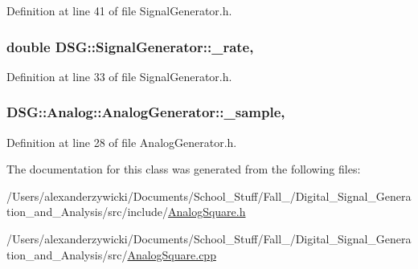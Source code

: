 Definition at line 41 of file Signal\-Generator.\-h.

\hypertarget{classDSG_1_1SignalGenerator_aa10f6c85d9adee901139ea7fb346f39d}{
\subsubsection[{\-\_\-rate}]{\setlength{\rightskip}{0pt plus 5cm}double D\-S\-G\-::\-Signal\-Generator\-::\-\_\-rate\hspace{0.3cm}{\ttfamily [protected]}, {\ttfamily [inherited]}}}\label{classDSG_1_1SignalGenerator_aa10f6c85d9adee901139ea7fb346f39d}


Definition at line 33 of file Signal\-Generator.\-h.

\hypertarget{classDSG_1_1Analog_1_1AnalogGenerator_af20b26cee2cd03dfdb3d845f527b2f1c}{
\subsubsection[{\-\_\-sample}]{ D\-S\-G\-::\-Analog\-::\-Analog\-Generator\-::\-\_\-sample\hspace{0.3cm}{\ttfamily [protected]}, {\ttfamily [inherited]}}}\label{classDSG_1_1Analog_1_1AnalogGenerator_af20b26cee2cd03dfdb3d845f527b2f1c}


Definition at line 28 of file Analog\-Generator.\-h.



The documentation for this class was generated from the following files\-:\begin{DoxyCompactItemize}
\item 
/\-Users/alexanderzywicki/\-Documents/\-School\-\_\-\-Stuff/\-Fall\-\_/\-Digital\-\_\-\-Signal\-\_\-\-Generation\-\_\-and\-\_\-\-Analysis/src/include/\hyperlink{AnalogSquare_8h}{Analog\-Square.\-h}\item 
/\-Users/alexanderzywicki/\-Documents/\-School\-\_\-\-Stuff/\-Fall\-\_/\-Digital\-\_\-\-Signal\-\_\-\-Generation\-\_\-and\-\_\-\-Analysis/src/\hyperlink{AnalogSquare_8cpp}{Analog\-Square.\-cpp}\end{DoxyCompactItemize}
